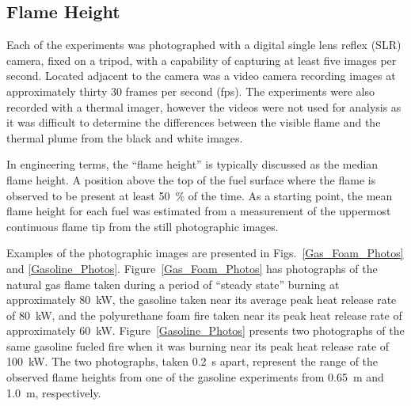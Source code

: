 \documentclass[twoside]{uocthesis}
\begin{document}
{\subsection{Flame Height}

Each of the experiments was photographed with a digital single lens reflex (SLR) camera, fixed on a tripod, with a capability of capturing at least five images per second.  Located adjacent to the camera was a video camera recording images at approximately thirty 30 frames per second (fps).  The experiments were also recorded with a thermal imager, however the videos were not used for analysis as it was difficult to determine the differences between the visible flame and the thermal plume from the black and white images.

In engineering terms, the ``flame height'' is typically discussed as the median flame height.  A position above the top of the fuel surface where the flame is observed to be present at least 50~\% of the time.  As a starting point, the mean flame height for each fuel was estimated from a measurement of the uppermost continuous flame tip from the still photographic images.

Examples of the photographic images are presented in Figs.~\ref{Gas_Foam_Photos} and \ref{Gasoline_Photos}.  Figure~\ref{Gas_Foam_Photos} has photographs of the natural gas flame taken during a period of ``steady state'' burning at approximately 80~kW, the gasoline taken near its average peak heat release rate of 80~kW, and the polyurethane foam fire taken near its peak heat release rate of approximately 60~kW.  Figure~\ref{Gasoline_Photos} presents two photographs of the same gasoline fueled fire when it was burning near its peak heat release rate of 100~kW.  The two photographs, taken 0.2~s apart, represent the range of the observed flame heights from one of the gasoline experiments from 0.65~m and 1.0~m, respectively.  

}
\end{document}
